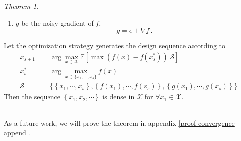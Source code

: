 \documentclass[a4paper,onecolumn]{article}
\theoremstyle{remark}
\newtheorem{theorem}{Theorem}
\begin{document}
{{\begin{theorem}
\begin{enumerate}
        \item $g$ be the noisy gradient of $f$,
              $$
                  g = \epsilon + \nabla f\,.
              $$
    \end{enumerate}
    Let the optimization strategy generates the design sequence according to 
    \begin{equation*}\begin{split}
        x_{s+1} &= \arg\max_{x\in\mathcal{X}} \mathbb{E} \left[
        \max\left( f(x) -  f(x_s^*) \right) \Big| \mathcal{S}
        \right]\\
        x_s^* &= \arg\max_{x\in\{x_1,\cdots,x_s\}}f(x)\\
        \mathcal{S} &= \Big\{ \left\{x_1,\cdots, x_s\right\} ,
        \left\{f(x_1),\cdots, f(x_s)\right\},
        \left\{g(x_1),\cdots, g(x_s)\right\}\Big\}
    \end{split}\end{equation*}
    Then the sequence $\left\{ x_1, x_2, \cdots \right\}$ 
    is dense in $\mathcal{X}$ for $\forall x_1\in \mathcal{X}$.
    \label{theorem: 2}
\end{theorem}
}}\\

\noindent As a future work, we will prove the theorem in appendix \ref{proof convergence append}.
\end{document}
